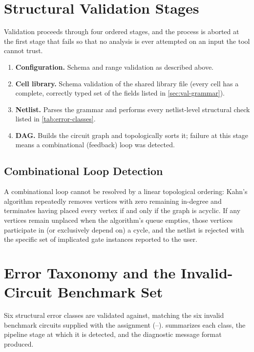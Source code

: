 \section{Structural Validation Stages}
\label{sec:val-stages}

Validation proceeds through four ordered stages, and the process is
aborted at the first stage that fails so that no analysis is ever attempted
on an input the tool cannot trust.

\begin{enumerate}
    \item \textbf{Configuration.} Schema and range validation as described
          above.
    \item \textbf{Cell library.} Schema validation of the shared library
          file (every cell has a complete, correctly typed set of the
          fields listed in \cref{sec:val-grammar}).
    \item \textbf{Netlist.} Parses the grammar and performs every
          netlist-level structural check listed in \cref{tab:error-classes}.
    \item \textbf{DAG.} Builds the circuit graph and topologically sorts it;
          failure at this stage means a combinational (feedback) loop was
          detected.
\end{enumerate}

\subsection{Combinational Loop Detection}
\label{sec:val-cycle}

A combinational loop cannot be resolved by a linear topological ordering:
Kahn's algorithm repeatedly removes vertices with zero remaining in-degree
and terminates having placed every vertex if and only if the graph is
acyclic. If any vertices remain unplaced when the algorithm's queue empties,
those vertices participate in (or exclusively depend on) a cycle, and the
netlist is rejected with the specific set of implicated gate instances
reported to the user.

\section{Error Taxonomy and the Invalid-Circuit Benchmark Set}
\label{sec:val-errors}

Six structural error classes are validated against, matching the six
invalid benchmark circuits supplied with the assignment
(--).  summarizes each class,
the pipeline stage at which it is detected, and the diagnostic message
format produced.

